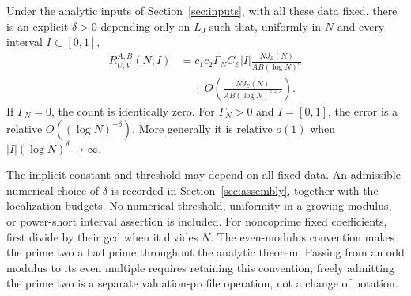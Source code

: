\begin{theorem}\label{thm:general}
Under the analytic inputs of Section~\ref{sec:inputs}, with all these
data fixed, there is an explicit \(\delta>0\)
depending only on \(L_0\) such that, uniformly in \(N\) and every interval
\(I\subset[0,1]\),
\begin{align*}
 R_{U,V}^{A,B}(N;I)
 &=c_1c_2\Gamma_N C_{\mathcal E}|I|
       \frac{NJ_{\mathcal E}(N)}{AB(\log N)^\kappa}\\
 &\quad+O\left(\frac{NJ_{\mathcal E}(N)}
                         {AB(\log N)^{\kappa+\delta}}\right).
\end{align*}
If \(\Gamma_N=0\), the count is identically zero.
For \(\Gamma_N>0\) and \(I=[0,1]\), the error is a relative
\(O((\log N)^{-\delta})\). More generally it is relative \(o(1)\)
when \(|I|(\log N)^\delta\to\infty\).
\end{theorem}

The implicit constant and threshold may depend on all fixed data.
An admissible numerical choice of \(\delta\) is recorded in
Section~\ref{sec:assembly}, together with the localization budgets.
No numerical threshold, uniformity in a growing modulus, or
power-short interval assertion is included. For noncoprime fixed
coefficients, first divide by their gcd when it divides \(N\).
The even-modulus convention makes the prime two a bad prime throughout
the analytic theorem. Passing from an odd modulus to its even multiple
requires retaining this convention; freely admitting the prime two is
a separate valuation-profile operation, not a change of notation.

